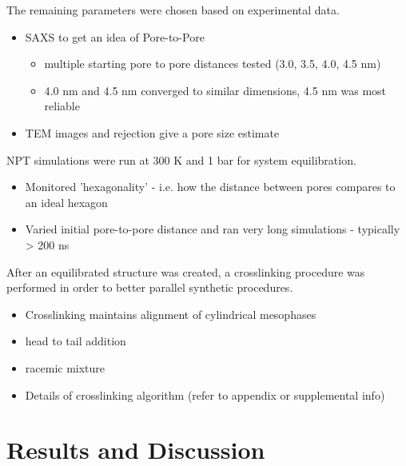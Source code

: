 \documentclass{article}
\begin{document}
	\noindent The remaining parameters were chosen based on experimental data. 
	\begin{itemize}
		\item SAXS to get an idea of Pore-to-Pore
		\begin{itemize}
			\item multiple starting pore to pore distances tested (3.0, 3.5, 4.0, 4.5 nm)
			\item 4.0 nm and 4.5 nm converged to similar dimensions, 4.5 nm was most reliable
		\end{itemize}
		\item TEM images and rejection give a pore size estimate
	\end{itemize}
	
	\noindent NPT simulations were run at 300 K and 1 bar for system equilibration.
	\begin{itemize}
		\item Monitored 'hexagonality' - i.e. how the distance between pores compares to an ideal hexagon
		\item Varied initial pore-to-pore distance and ran very long simulations - typically > 200 ns
	\end{itemize}
	
	After an equilibrated structure was created, a crosslinking procedure was performed in order to better parallel synthetic procedures. 
	\begin{itemize}
		\item Crosslinking maintains alignment of cylindrical mesophases
		\item head to tail addition
		\item racemic mixture 
		\item Details of crosslinking algorithm (refer to appendix or supplemental info)
	\end{itemize}  
	
	\section{Results and Discussion}
\end{document}
